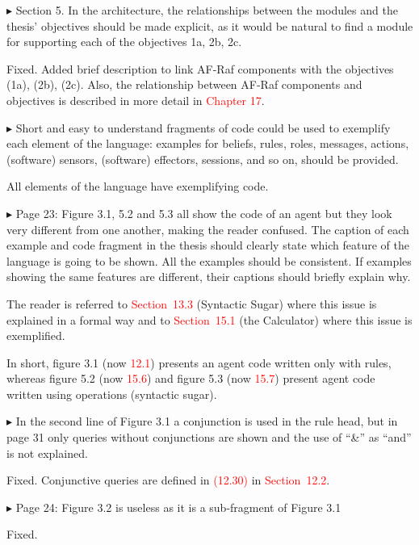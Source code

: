 \documentclass{article}
\newcommand*\R[1]{\textcolor{red}{#1}} %
\newenvironment{them}%
  {\bigskip\noindent\begingroup\color{blue}$\blacktriangleright$\enspace}%
  {\endgroup\par}
\begin{document}
\begin{them}
Section 5.
In the architecture, the relationships between the modules and the thesis'
objectives should be made explicit, as it would be natural to find a module for
supporting each of the objectives 1a, 2b, 2c.
\end{them}
Fixed. Added brief description to link AF-Raf components with the objectives
(1a), (2b), (2c). Also, the relationship between AF-Raf components and
objectives is described in  more detail in \R{Chapter 17}.

\begin{them}
Short and easy to understand fragments of code could be used to exemplify each
element of the language: examples for beliefs, rules, roles, messages, actions,
(software) sensors, (software) effectors, sessions, and so on, should be
provided.
\end{them}
All elements of the language have exemplifying code. 

\begin{them}
Page 23:
Figure 3.1, 5.2 and 5.3 all show the code of an agent but they look very
different from one another, making the reader confused. The caption of each
example and code fragment in the thesis should clearly state which feature of
the language is going to be shown. All the examples should be consistent. If
examples showing the same features are different, their captions should briefly
explain why.
\end{them}
The reader is referred to \R{Section~13.3} (Syntactic Sugar) where this issue
is explained in a formal way and to \R{Section~15.1} (the Calculator) where
this issue is exemplified.

In short, figure 3.1 (now \R{12.1}) presents an agent code written only with
rules, whereas figure 5.2 (now \R{15.6}) and figure 5.3 (now \R{15.7}) present
agent code written using operations (syntactic sugar).

\begin{them}
In the second line of Figure 3.1 a conjunction is used in the rule head, but in
page 31 only queries without conjunctions are shown and the use of ``\&'' as
``and'' is not explained.
\end{them}
Fixed.
Conjunctive queries are defined in \R{(12.30)} in \R{Section~12.2}.


\begin{them}
Page 24:
Figure 3.2 is useless as it is a sub-fragment of Figure 3.1
\end{them}
Fixed. 
\end{document}
